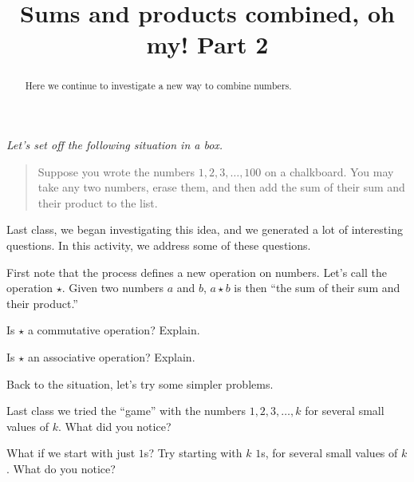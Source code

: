\documentclass[handout,space,nooutcomes]{ximera}
\title{Sums and products combined, oh my!  Part 2}
\begin{document}
\begin{abstract}
Here we continue to investigate a new way to combine numbers.
\end{abstract}
\maketitle

\emph{Let's set off the following situation in a box.} 
\begin{quote}
Suppose you wrote the numbers $1,2,3,\dots,100$ on a chalkboard. You
may take any two numbers, erase them, and then add the sum of their
sum and their product to the list.
\end{quote}
Last class, we began investigating this idea, and we generated a lot of interesting questions.  
In this activity, we address some of these questions.  

First note that the process defines a new operation on numbers.  Let's call the operation $\star$.  Given two numbers $a$ and $b$,  $a\star b$ is then ``the sum of their sum and their product.''    

\begin{problem}
Is $\star$ a commutative operation?  Explain.  
\begin{freeResponse}
\end{freeResponse}
\end{problem}

\begin{problem}
Is $\star$ an associative operation?  Explain.  
\begin{freeResponse}
\end{freeResponse}
\end{problem}

Back to the situation, let's try some simpler problems.  

\begin{problem}
Last class we tried the ``game'' with the numbers $1,2,3,\dots, k$ for
several small values of $k$.  What did you notice?
\begin{freeResponse}
\end{freeResponse}
\end{problem}

\begin{problem}
What if we start with just $1$s?  Try starting with $k$ $1$s, for
several small values of $k$.  What do you notice?
\begin{freeResponse}
\end{freeResponse}
\end{problem}
\end{document}

